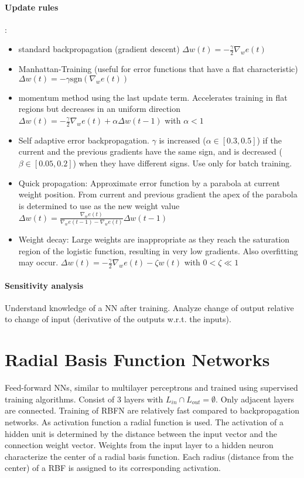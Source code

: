 \paragraph{Update rules}:
\begin{itemize}
\item standard backpropagation (gradient descent) $\Delta w(t) = - \frac{\gamma}{2}\nabla_w e(t)$
\item Manhattan-Training (useful for error functions that have a flat characteristic) $\Delta w(t) = -\gamma \text{sgn} (\nabla_w e(t))$
\item momentum method using the last update term. Accelerates training in flat regions but decreases in an uniform direction $\Delta w(t) = -\frac{\gamma}{2}\nabla_w e(t) + \alpha \Delta w(t-1)$ with $\alpha<1$
\item Self adaptive error backpropagation. $\gamma$ is increased ($\alpha \in [0.3, 0.5]$) if the current and the previous gradients have the same sign, and is decreased ($\beta \in [0.05,0.2]$) when they have different signs. Use only for batch training.
\item Quick propagation: Approximate error function by a parabola at current weight position. From current and previous gradient the apex of the parabola is determined to use as the new weight value $\Delta w(t) = \frac{\nabla_w e(t)}{\nabla_w e(t-1)-\nabla_w e(t)}\Delta w(t-1)$
\item Weight decay: Large weights are inappropriate as they reach the saturation region of the logistic function, resulting in very low gradients. Also overfitting may occur. $\Delta w(t) = -\frac{\gamma}{2} \nabla_w e(t) - \zeta w(t)$ with $0<\zeta \ll 1$
\end{itemize}

\paragraph{Sensitivity analysis}
Understand knowledge of a NN after training. Analyze change of output relative to change of input (derivative of the outputs w.r.t. the inputs).


\section{Radial Basis Function Networks}
Feed-forward NNs, similar to multilayer perceptrons and trained using supervised training algorithms. Consist of 3 layers with $L_{in} \cap L_{out} = \emptyset$. Only adjacent layers are connected. Training of RBFN are relatively fast compared to backpropagation networks. As activation function a radial function is used. The activation of a hidden unit is determined by the distance between the input vector and the connection weight vector.  Weights from the input layer to a hidden neuron characterize the center of a radial basis function. Each radius (distance from the center) of a RBF is assigned to its corresponding activation.\\
